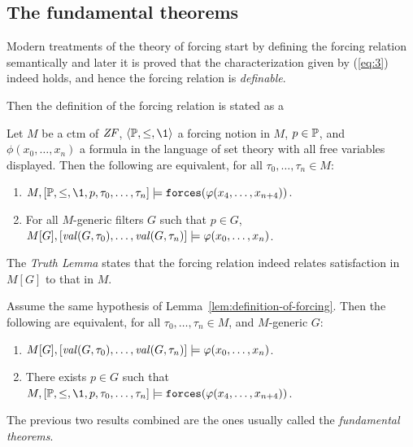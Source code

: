 \subsection{The fundamental theorems}
\label{sec:fundamental-theorems}
Modern treatments of the theory of forcing start
by defining the 
forcing relation semantically and later it is proved  that the
characterization given by (\ref{eq:3}) indeed holds, and hence the
forcing relation is \emph{definable}.

Then the definition of the forcing relation is stated as a
\begin{lemma}\label{lem:definition-of-forcing}
  Let $M$ be a ctm of $\mathit{ZF}$, $\lb\PP,\leq,\1\rb$ a forcing notion
  in $M$, $p\in\mathbb{P}$, and $\phi(x_0,\dots,x_n)$ a formula in the
  language of set 
  theory with all free variables displayed. Then the
  following are equivalent, for all $\tau_0,\dots,\tau_n\in M$:
  \begin{enumerate}
  \item $M,[\PP,\leq,\1,p,\tau_0,\dots,\tau_n] 
  \models\forceisa(\phi(x_4,\dots,x_{n+4}))$.
  \item For all $M$-generic filters $G$ such that $p\in G$,
    $M[G],[\operatorname{\mathit{val}}(G,\tau_0),\dots,\operatorname{\mathit{val}}(G,\tau_n)] \models\varphi(x_0,\dots,x_n)$.
  \end{enumerate}
\end{lemma}

The \emph{Truth Lemma} states that the forcing
relation indeed relates 
satisfaction in $M[G]$ to that in $M$. 
\begin{lemma}\label{lem:truth-lemma}
  Assume the same hypothesis of
  Lemma~\ref{lem:definition-of-forcing}. Then the
  following are equivalent, for all $\tau_0,\dots,\tau_n\in M$, and
  $M$-generic $G$: 
  \begin{enumerate}
  \item $M[G],[\operatorname{\mathit{val}}(G,\tau_0),\dots,\operatorname{\mathit{val}}(G,\tau_n)]
  \models\varphi(x_0,\dots,x_n)$.
  \item  There exists $p\in G$ such that $M,[\PP,\leq,\1,p,\tau_0,\dots,\tau_n] 
  \models\forceisa(\phi(x_4,\dots,x_{n+4}))$.
  \end{enumerate}
\end{lemma}
\noindent The previous two results combined are the ones usually called the
\emph{fundamental theorems}. 

